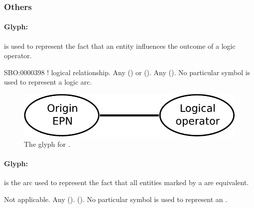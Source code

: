 \subsubsection{Others}


\paragraph{Glyph:  }\label{sec:logicArc}

 is used to represent the fact that an entity influences
the outcome of a logic operator. 

\begin{glyphDescription}
 \glyphSboTerm SBO:0000398 ! logical relationship.
 \glyphOrigin Any  () or  ().
 \glyphTarget Any  ().
 \glyphEndPoint No particular symbol is used to represent a logic arc.
 \end{glyphDescription}

\begin{figure}[H]
  \centering
  \includegraphics[scale = 0.4]{images/logicArc}
  \caption{The \PD glyph for .}
  \label{fig:logicArc}
\end{figure}


\paragraph{Glyph:  }\label{sec:equivalenceArc}

 is the arc used to represent the fact that all entities
marked by a  are equivalent. 

\begin{glyphDescription}
 \glyphSboTerm Not applicable.
 \glyphOrigin Any  ().
 \glyphTarget {} ().
 \glyphEndPoint No particular symbol is used to represent an .
 \end{glyphDescription}

